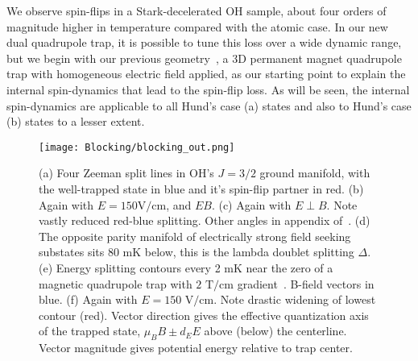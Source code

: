 \documentclass[%
 reprint,
groupedaddress,
 amsmath,amssymb,
 aps,
prl,
]{revtex4-1}
\newcommand{\epb}{$E\!\perp\!B$}
\begin{document}
We observe spin-flips in a Stark-decelerated OH sample, about four orders of magnitude higher in temperature compared with the atomic case. In our new dual quadrupole trap, it is possible to tune this loss over a wide dynamic range, but we begin with our previous geometry~\cite{Sawyer2008}, a 3D permanent magnet quadrupole trap with homogeneous electric field applied, as our starting point to explain the internal spin-dynamics that lead to the spin-flip loss. As will be seen, the internal spin-dynamics are applicable to all Hund's case (a) states and also to Hund's case (b) states to a lesser extent.%


\begin{figure}[tb]
\texttt{[image: Blocking/blocking\_out.png]}%
\caption{
(a) Four Zeeman split lines in OH's $J=3/2$ ground manifold, with the well-trapped state in blue and it's spin-flip partner in red. (b) Again with $E=150\text{V/cm}$, and $E$\raisebox{0.5px}{$\parallel$}$B$. (c) Again with \epb. Note vastly reduced red-blue splitting. Other angles in appendix of~\cite{Stuhl2013}. (d) The opposite parity manifold of electrically strong field seeking substates sits $80\text{ mK}$ below, this is the lambda doublet splitting $\Delta$. (e) Energy splitting contours every 2 mK near the zero of a magnetic quadrupole trap with $2\text{ T/cm}$ gradient~\cite{Stuhl2012uwave}. B-field vectors in blue. (f) Again with $E=150\text{ V/cm}$. Note drastic widening of lowest contour (red). Vector direction gives the effective quantization axis of the trapped state, $\mu_BB\pm d_EE$ above (below) the centerline. Vector magnitude gives potential energy relative to trap center.
\label{fig:blocking}}
\end{figure}

\end{document}
